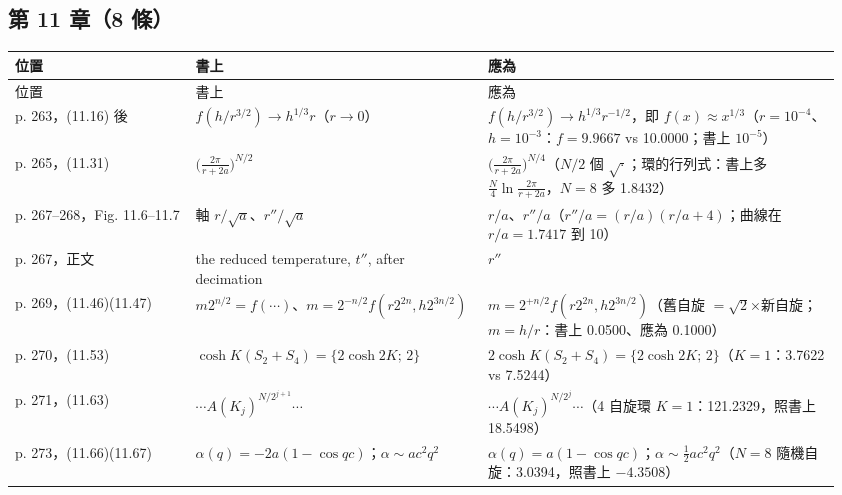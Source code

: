 \subsection{第 11 章（8 條）}
{\footnotesize\renewcommand{\arraystretch}{1.1}\setlength{\tabcolsep}{4pt}
\begin{longtable}{@{}>{\raggedright\arraybackslash}p{0.21\linewidth}>{\raggedright\arraybackslash}p{0.34\linewidth}>{\raggedright\arraybackslash}p{0.41\linewidth}@{}}
\toprule 位置 & 書上 & 應為\\ \midrule\endfirsthead
\toprule 位置 & 書上 & 應為\\ \midrule\endhead
\bottomrule\endfoot
p. 263，(11.16) 後 & $f(h/r^{3/2})\to h^{1/3}r$（$r\to0$） & $f(h/r^{3/2})\to h^{1/3}r^{-1/2}$，即 $f(x)\approx x^{1/3}$（$r=10^{-4}$、$h=10^{-3}$：$f=9.9667$ vs 10.0000；書上 $10^{-5}$）\\
p. 265，(11.31) & $\big(\frac{2\pi}{r+2a}\big)^{N/2}$ & $\big(\frac{2\pi}{r+2a}\big)^{N/4}$（$N/2$ 個 $\sqrt{\cdot}$；環的行列式：書上多 $\frac N4\ln\frac{2\pi}{r+2a}$，$N=8$ 多 1.8432）\\
p. 267–268，Fig. 11.6–11.7 & 軸 $r/\sqrt a$、$r''/\sqrt a$ & $r/a$、$r''/a$（$r''/a=(r/a)(r/a+4)$；曲線在 $r/a=1.7417$ 到 10）\\
p. 267，正文 & the reduced temperature, $t''$, after decimation & $r''$\\
p. 269，(11.46)(11.47) & $m2^{n/2}=f(\cdots)$、$m=2^{-n/2}f(r2^{2n},h2^{3n/2})$ & $m=2^{+n/2}f(r2^{2n},h2^{3n/2})$（舊自旋 $=\sqrt2$×新自旋；$m=h/r$：書上 0.0500、應為 0.1000）\\
p. 270，(11.53) & $\cosh K(S_2+S_4)=\{2\cosh2K;\,2\}$ & $2\cosh K(S_2+S_4)=\{2\cosh2K;\,2\}$（$K=1$：3.7622 vs 7.5244）\\
p. 271，(11.63) & $\cdots A(K_j)^{N/2^{j+1}}\cdots$ & $\cdots A(K_j)^{N/2^j}\cdots$（4 自旋環 $K=1$：121.2329，照書上 18.5498）\\
p. 273，(11.66)(11.67) & $\alpha(q)=-2a(1-\cos qc)$；$\alpha\sim ac^2q^2$ & $\alpha(q)=a(1-\cos qc)$；$\alpha\sim\frac12ac^2q^2$（$N=8$ 隨機自旋：3.0394，照書上 $-4.3508$）\\
\end{longtable}}

